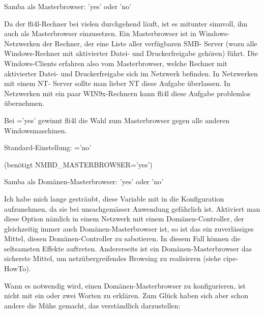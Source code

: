 \begin{description}

    Samba als Masterbrowser: 'yes' oder 'no'

    Da der fli4l-Rechner bei vielen durchgehend läuft, ist es mitunter
    sinnvoll, ihn auch als Masterbrowser einzusetzen. Ein Masterbrowser ist
    in Windows-Netzwerken der Rechner, der eine Liste aller verfügbaren SMB-
    Server (wozu alle Windows-Rechner mit aktivierter Datei- und
    Druckerfreigabe gehören) führt. Die Windows-Clients erfahren also vom
    Masterbrowser, welche Rechner mit aktivierter Datei- und
    Druckerfreigabe sich im Netzwerk befinden. In Netzwerken mit einem NT-
    Server sollte man lieber NT diese Aufgabe überlassen. In Netzwerken mit
    ein paar WIN9x-Rechnern kann fli4l diese Aufgabe problemlos übernehmen.

    Bei ='yes' gewinnt fli4l die Wahl zum Masterbrowser
    gegen alle anderen Windowsmaschinen.

    Standard-Einstellung: ='no'


 (benötigt NMBD\_MASTERBROWSER='yes')

    Samba als Domänen-Masterbrowser: 'yes' oder 'no'

    Ich habe mich lange gesträubt, diese Variable mit in die Konfiguration
    aufzunehmen, da sie bei unsachgemässer Anwendung gefährlich ist.
    Aktiviert man diese Option nämlich in einem Netzwerk mit einem
    Domänen-Controller, der gleichzeitig immer auch Domänen-Masterbrowser ist,
    so ist das ein zuverlässiges Mittel, diesen Domänen-Controller zu sabotieren.
    In diesem Fall können die seltsamsten Effekte auftreten.
    Andererseits ist ein Domänen-Masterbrowser das sicherste Mittel, um
    netzübergreifendes Browsing zu realisieren (siehe cipe-HowTo).

    Wann es notwendig wird, einen Domänen-Masterbrowser zu konfigurieren, ist
    nicht mit ein oder zwei Worten zu erklären. Zum Glück haben sich aber schon
    andere die Mühe gemacht, das verständlich darzustellen:




\end{description}
